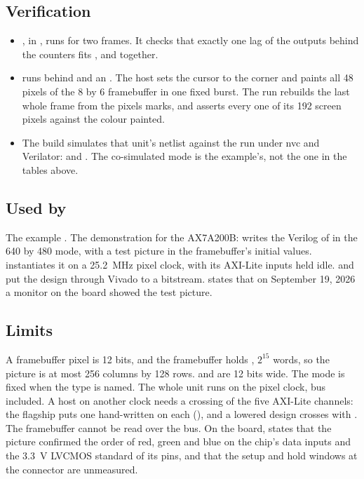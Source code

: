 \subsection*{Verification}

\begin{itemize}
\item {}, in
, runs  for two frames. It checks that exactly one lag of the outputs
behind the counters fits ,  and 
together.
\item {} runs 
behind  and an . The host sets the
cursor to the corner and paints all 48 pixels of the 8 by 6
framebuffer in one fixed burst. The run rebuilds the last whole frame
from the pixels  marks, and asserts every one of its 192
screen pixels against the colour painted.
\item The build simulates that unit's netlist against the run under
nvc and Verilator: 
and . The co-simulated mode
is the example's, not the one in the tables above.
\end{itemize}

\subsection*{Used by}

The example . The demonstration for the AX7A200B:
 writes the Verilog of  in the
640 by 480 mode, with a test picture in the framebuffer's initial
values.  instantiates it on a 25.2~MHz
pixel clock, with its AXI-Lite inputs held idle.
 and  put the design
through Vivado to a bitstream.  states that on
September 19, 2026 a monitor on the board showed the test picture.

\subsection*{Limits}

A framebuffer pixel is 12 bits, and the framebuffer holds
, $2^{15}$ words, so the picture is at most 256
columns by 128 rows.  and  are 12 bits wide. The mode
is fixed when the type is named. The whole unit runs on the pixel
clock, bus included. A host on another clock needs a crossing of the
five AXI-Lite channels: the flagship puts one hand-written
 on each (), and a
lowered design crosses with . The
framebuffer cannot be read over the bus. On the board, 
states that the picture confirmed the order of red, green and blue on
the chip's data inputs and the 3.3~V LVCMOS standard of its pins,
and that the setup and hold windows at the connector are unmeasured.
